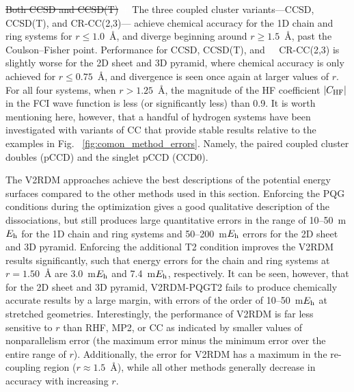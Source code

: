 \documentclass[aip,jcp,amsmath,amssymb, preprint]{revtex4-1}
\newcommand*{\Eh}{$E_{\rm h}$\xspace}
\newcommand{\add}[1]{\colorbox{goodgreen}{\textcolor{white}{\footnotesize  \fontfamily{phv}\selectfont +}}
    \textcolor{goodgreen}{{#1}}\xspace}
\newcommand{\remove}[1]{
\colorbox{goodred}{\textcolor{white}{\footnotesize  \fontfamily{phv}\selectfont \textminus\vphantom{c}}}
\textcolor{goodred}{\sout{#1}}\xspace
}
\begin{document}
\remove{Both CCSD and CCSD(T)} \add{The three coupled cluster variants---CCSD, CCSD(T), and CR-CC(2,3)---} achieve chemical accuracy for the 1D chain and ring systems for $r\leq1.0$~{\AA}, and diverge beginning around $r\geq1.5$~{\AA}, past the Coulson--Fisher point. 
Performance for CCSD, CCSD(T), and \add{CR-CC(2,3)} is slightly worse for the 2D sheet and 3D pyramid, where chemical accuracy is only achieved for $r\leq0.75$~{\AA}, and divergence is seen once again at larger values of $r$.   
For all four systems, when $r>1.25$~{\AA}, the magnitude of the HF coefficient $|C_{\rm{HF}}|$ in the FCI wave function is less (or significantly less) than 0.9.
It is worth mentioning here, however, that a handful of hydrogen systems have been investigated with variants of CC that provide stable results relative to the examples in Fig. ~\ref{fig:comon_method_errors}. Namely, the paired coupled cluster doubles (pCCD) \cite{Limacher2013NewMean} and the singlet pCCD (CCD0). \cite{Bulik2015CanSingle}
           
The V2RDM approaches achieve the best descriptions of the potential energy surfaces compared to the other methods used in this section. Enforcing the PQG conditions during the optimization gives a good qualitative description of the dissociations, but still produces large quantitative errors in the range of 10--50~m\Eh for the 1D chain and ring systems and 50--200~m\Eh errors for the 2D sheet and 3D pyramid.
Enforcing the additional T2 condition improves the V2RDM results significantly, such that energy errors for the chain and ring systems at $r=1.50$~{\AA} are 3.0~m\Eh and 7.4~m\Eh, respectively.
It can be seen, however, that for the 2D sheet and 3D pyramid, V2RDM-PQGT2 fails to produce chemically accurate results by a large margin, with errors of the order of 10--50~m\Eh at stretched geometries.  
Interestingly, the performance of V2RDM is far less sensitive to $r$ than RHF, MP2, or CC as indicated by smaller values of nonparallelism error (the maximum error minus the minimum error over the entire range of $r$). 
Additionally, the error for V2RDM has a maximum in the re-coupling region ($r\approx1.5$~{\AA}), while all other methods generally decrease in accuracy with increasing $r$.
\end{document}
